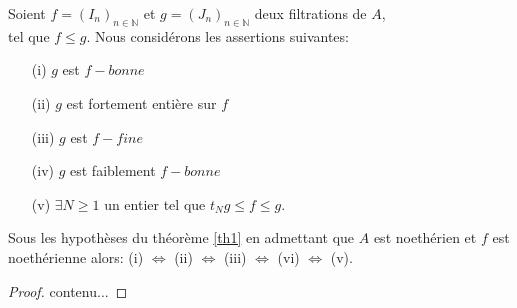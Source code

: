 \begin{maproposition}
	\label{th1}
	Soient $f=(I_n)_{n \in \mathbb{N}}$ et $g=(J_n)_{n \in \mathbb{N}}$ deux filtrations de $A$,\\ tel que $f \leqslant  g$. Nous considérons les assertions suivantes:\\
	\begin{enumerate}
		
		\item[(i)] $g$ est $f-bonne$

		\item[(ii)] $g$ est fortement entière sur $f$
		
		\item[(iii)] $g$ est $f-fine$
		
		\item[(iv)] $g$ est faiblement $f-bonne$
		
		\item[(v)]  $\exists N \geqslant 1$ un entier tel que $t_Ng \leqslant f \leqslant g$.
	\end{enumerate}
\end{maproposition}
\begin{maproposition}
	Sous les hypothèses du théorème \eqref{th1} en admettant que $A$ est noethérien
	et $f$ est noethérienne alors:
	(i) $\Longleftrightarrow $ (ii) $\Longleftrightarrow $ (iii) $\Longleftrightarrow $ (vi) $\Longleftrightarrow $ (v). 
\end{maproposition}
\begin{proof}
	contenu...
\end{proof}

